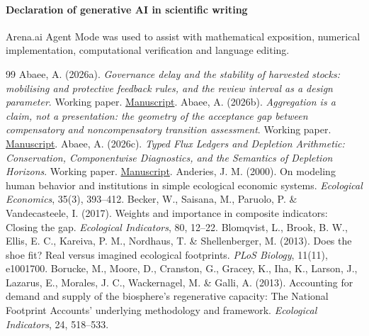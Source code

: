 \documentclass[preprint,12pt,authoryear]{elsarticle}
\begin{document}
\paragraph{Declaration of generative AI in scientific writing} Arena.ai Agent Mode was used to assist with mathematical exposition, numerical implementation, computational verification and language editing.
\begin{thebibliography}{99}
 Abaee, A. (2026a). \emph{Governance delay and the stability of harvested stocks: mobilising and protective feedback rules, and the review interval as a design parameter}. Working paper. \href{https://github.com/MIKEAA2020/general-sustainability/blob/2efaa62083f2007dec3446c15c475af88f0925f3/arena%20agent%201/paper%20rewrites/latex/paper4_delay_dynamics_v41.pdf}{Manuscript}.
 Abaee, A. (2026b). \emph{Aggregation is a claim, not a presentation: the geometry of the acceptance gap between compensatory and noncompensatory transition assessment}. Working paper. \href{https://github.com/MIKEAA2020/general-sustainability/blob/2efaa62083f2007dec3446c15c475af88f0925f3/arena%20agent%201/paper%20rewrites/latex/paper06_assessment_separation_v71.pdf}{Manuscript}.
 Abaee, A. (2026c). \emph{Typed Flux Ledgers and Depletion Arithmetic: Conservation, Componentwise Diagnostics, and the Semantics of Depletion Horizons}. Working paper. \href{https://github.com/MIKEAA2020/general-sustainability/blob/2efaa62083f2007dec3446c15c475af88f0925f3/paper3/latest-2026-09-19/manuscript/paper3_material_ledgers_v50.pdf}{Manuscript}.
 Anderies, J. M. (2000). On modeling human behavior and institutions in simple ecological economic systems. \emph{Ecological Economics}, 35(3), 393--412.
 Becker, W., Saisana, M., Paruolo, P. \& Vandecasteele, I. (2017). Weights and importance in composite indicators: Closing the gap. \emph{Ecological Indicators}, 80, 12--22.
 Blomqvist, L., Brook, B. W., Ellis, E. C., Kareiva, P. M., Nordhaus, T. \& Shellenberger, M. (2013). Does the shoe fit? Real versus imagined ecological footprints. \emph{PLoS Biology}, 11(11), e1001700.
 Borucke, M., Moore, D., Cranston, G., Gracey, K., Iha, K., Larson, J., Lazarus, E., Morales, J. C., Wackernagel, M. \& Galli, A. (2013). Accounting for demand and supply of the biosphere's regenerative capacity: The National Footprint Accounts' underlying methodology and framework. \emph{Ecological Indicators}, 24, 518--533.

\end{thebibliography}
\end{document}

